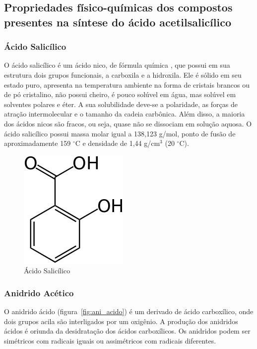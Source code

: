\subsection{Propriedades físico-químicas dos compostos presentes na síntese do ácido
acetilsalicílico}

\subsubsection{Ácido Salicílico}
O ácido salicílico é um ácido nico, de fórmula química , que possui em sua estrutura dois
grupos funcionais, a carboxila e a hidroxila. Ele é sólido em seu estado puro, apresenta na
temperatura ambiente na forma de cristais brancos ou de pó cristalino, não possui cheiro, é pouco
solúvel em água, mas solúvel em solventes polares e éter. A sua solubilidade deve-se a polaridade,
as forças de atração intermolecular e o tamanho da cadeia carbônica. Além disso, a maioria dos
ácidos nicos são fracos, ou seja, quase não se dissociam em solução aquosa. O ácido salicílico
possui massa molar igual a 138,123 g/mol, ponto de fusão de aproximadamente 159 $^\circ$C e densidade de
1,44 g/cm$^3$ (20 $^\circ$C).

\begin{figure}[H]
\begin{center}
    \includegraphics[scale=0.6]{figuras/acido_salicilico.png}
\end{center}
\caption{Ácido Salicílico}
\label{fig:ac_salicilico}
\end{figure}

\subsubsection{Anidrido Acético}

O anidrido ácido (figura~\ref{fig:ani_acido}) é um derivado de ácido carboxílico, onde dois grupos acila são
interligados por um oxigênio. A produção dos anidridos ácidos é oriunda da desidratação dos ácidos
carboxílicos. Os anidridos podem ser simétricos com radicais iguais ou assimétricos com radicais
diferentes.

